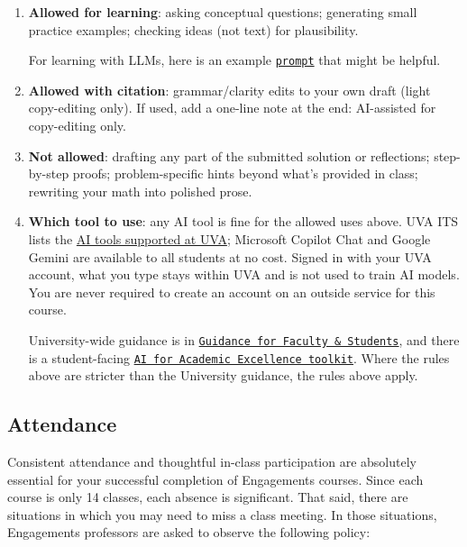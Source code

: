\documentclass[oneside,11pt]{amsart}
\begin{document}
\begin{enumerate}[$\bullet$]
  \item \textbf{Allowed for learning}: asking conceptual questions; generating small practice examples; checking ideas (not text) for plausibility.

\noindent
For learning with LLMs, here is an example \href{https://gist.githubusercontent.com/lenis2000/cb5ea004f8aa6461be71398e19ae488e/raw/a0103eab0b865a1cedf2f3bf3c00d217bd294005/AI_hint_prompt.txt}{\texttt{prompt}} that might be helpful.
  \item \textbf{Allowed with citation}: grammar/clarity edits to your own draft (light copy-editing only). If used, add a one-line note at the end: AI-assisted for copy-editing only.

  \item \textbf{Not allowed}: drafting any part of the submitted solution or reflections; step-by-step proofs; problem-specific hints beyond what's provided in class; rewriting your math into polished prose.

  \item \textbf{Which tool to use}: any AI tool is fine for the allowed uses above. UVA ITS lists the \href{https://in.virginia.edu/ai-tools-list}{AI tools supported at UVA}; Microsoft Copilot Chat and Google Gemini are available to all students at no cost. Signed in with your UVA account, what you type stays within UVA and is not used to train AI models. You are never required to create an account on an outside service for this course.

\noindent
University-wide guidance is in
\href{https://genai.provost.virginia.edu/guidance-for-faculty-students}{\texttt{Guidance for Faculty \& Students}},
and there is a student-facing
\href{https://genai.provost.virginia.edu/ai-for-academic-excellence-student-toolkit}{\texttt{AI for Academic Excellence toolkit}}.
Where the rules above are stricter than the University guidance, the rules above apply.
\end{enumerate}



\subsection{Attendance}

Consistent attendance and thoughtful in-class participation are absolutely essential for your successful completion of Engagements courses. Since each course is only 14 classes, each absence is significant. That said, there are situations in which you may need to miss a class meeting. In those situations,
Engagements professors are asked to observe the following policy:
\end{document}

